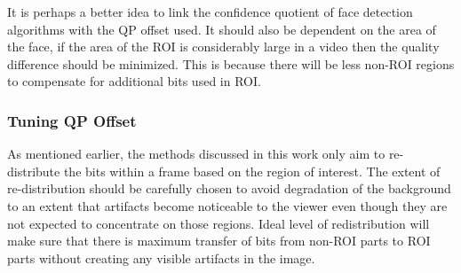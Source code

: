 \documentclass[11pt]{article} %
\begin{document}
It is perhaps a better idea to link the confidence quotient of face detection algorithms with the QP offset used. It should also be dependent on the area of the face, if the area of the ROI is considerably large in a video then the quality difference should be minimized. This is because there will be less non-ROI regions to compensate for additional bits used in ROI.
\fi

%
\subsubsection{Tuning QP Offset} \label{sec:Tuning QP Offset}
As mentioned earlier, the methods discussed in this work only aim to re-distribute the bits within a frame based on the region of interest. The extent of re-distribution should be carefully chosen to avoid degradation of the background to an extent that artifacts become noticeable to the viewer even though they are not expected to concentrate on those regions. Ideal level of redistribution will make sure that there is maximum transfer of bits from non-ROI parts to ROI parts without creating any visible artifacts in the image.
\iffalse
\end{document}
